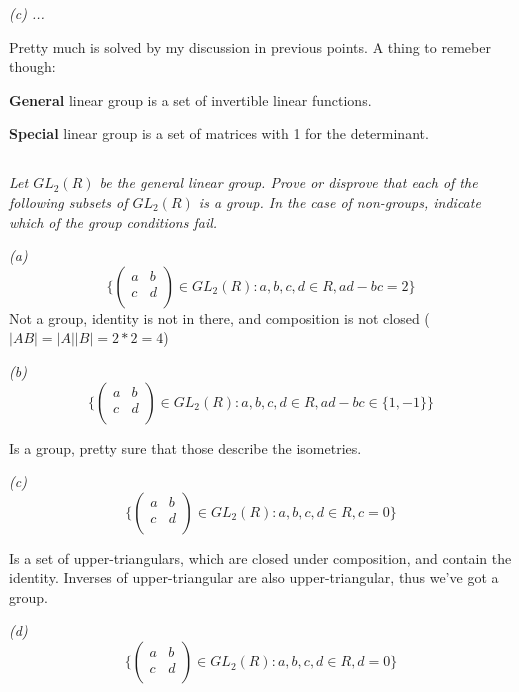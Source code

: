 \documentclass[11pt,oneside,titlepage]{book}
\newcommand{\set}[1]{\{ #1 \}}
\begin{document}
\textit{(c) ... }

Pretty much is solved by my discussion in previous points. A thing to remeber though:

\textbf{General} linear group is a set of invertible linear functions.

\textbf{Special} linear group is a set of matrices with 1 for the
determinant.

\subsection{}

\textit{Let $GL_2(R)$ be the general linear group. Prove or disprove
  that each of the following subsets of $GL_2(R)$ is a group. In the
  case of non-groups, indicate which of the group conditions fail.
}

\textit{(a)
  $$\set{
  \begin{pmatrix}
    a & b \\
    c & d \\
  \end{pmatrix} \in GL_2(R): a, b, c, d \in R, ad - bc = 2}
  $$
}
Not a group, identity is not in there, and composition is not closed ($|A B | = |A| |B| = 2 * 2 = 4$)

\textit{(b)
  $$\set{
  \begin{pmatrix}
    a & b \\
    c & d \\
  \end{pmatrix} \in GL_2(R): a, b, c, d \in R, ad - bc \in \set{1, -1}}
  $$
}

Is a group, pretty sure that those describe the isometries. 

\textit{(c)
  $$\set{
  \begin{pmatrix}
    a & b \\
    c & d \\
  \end{pmatrix} \in GL_2(R): a, b, c, d \in R, c = 0}
  $$
}

Is a set of upper-triangulars, which are closed under composition, and contain the identity.
Inverses of upper-triangular are also upper-triangular, thus we've got a group.

\textit{(d)
  $$\set{
  \begin{pmatrix}
    a & b \\
    c & d \\
  \end{pmatrix} \in GL_2(R): a, b, c, d \in R, d = 0}
  $$
}
\end{document}
